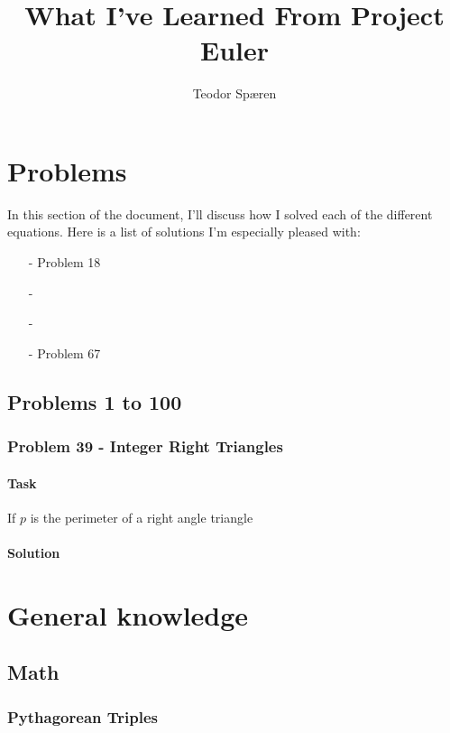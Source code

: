 \documentclass[a4paper]{report}
\begin{document}
\title{What I've Learned From Project Euler}
\author{Teodor Spæren}

\maketitle

\tableofcontents

\part{Problems}
In this section of the document, I'll discuss how I solved each of the different equations. Here is a list of solutions
I'm especially pleased with:

\begin{itemize}
    \item[-] Problem 18
    \item[-] 
    \item[-] 
    \item[-] Problem 67
\end{itemize}

\chapter{Problems 1 to 100}
\section{Problem 39 - Integer Right Triangles}
\label{sec:problem39}

\subsection{Task}


If $p$ is the perimeter of a right angle triangle 

\subsection{Solution}


\part{General knowledge}

\chapter{Math}
\section{Pythagorean Triples}
\end{document}
